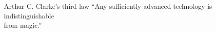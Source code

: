 \thispagestyle{empty}
\vfill
\begin{chapquote}{Arthur C. Clarke's third law}
``Any sufficiently advanced technology is indistinguishable \\from magic.''
\end{chapquote}



